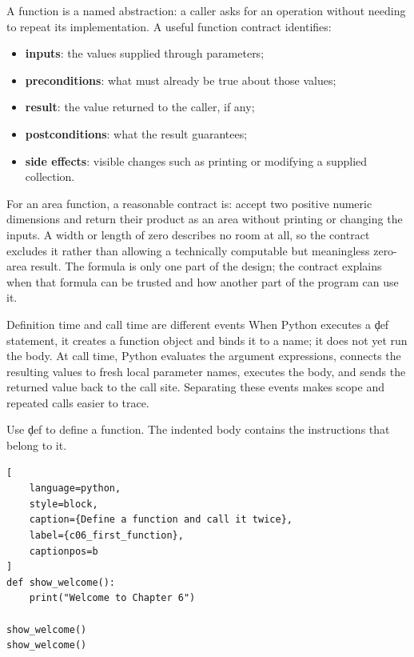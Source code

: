 A function is a named abstraction: a caller asks for an operation without
needing to repeat its implementation. A useful function contract identifies:
\begin{itemize}
    \item \textbf{inputs}: the values supplied through parameters;
    \item \textbf{preconditions}: what must already be true about those values;
    \item \textbf{result}: the value returned to the caller, if any;
    \item \textbf{postconditions}: what the result guarantees;
    \item \textbf{side effects}: visible changes such as printing or modifying
          a supplied collection.
\end{itemize}

For an area function, a reasonable contract is: accept two positive numeric
dimensions and return their product as an area without printing or changing
the inputs. A width or length of zero describes no room at all, so the
contract excludes it rather than allowing a technically computable but
meaningless zero-area result. The formula is only one part of the design; the contract explains
when that formula can be trusted and how another part of the program can use
it.

\begin{ExplainBox}{Definition time and call time are different events}
When Python executes a \c{def} statement, it creates a function object and
binds it to a name; it does not yet run the body. At call time, Python evaluates
the argument expressions, connects the resulting values to fresh local
parameter names, executes the body, and sends the returned value back to the
call site. Separating these events makes scope and repeated calls easier to
trace.
\end{ExplainBox}


Use \c{def} to define a function. The indented body contains the instructions
that belong to it.

\begin{lstlisting}[
    language=python,
    style=block,
    caption={Define a function and call it twice},
    label={c06_first_function},
    captionpos=b
]
def show_welcome():
    print("Welcome to Chapter 6")

show_welcome()
show_welcome()
\end{lstlisting}

